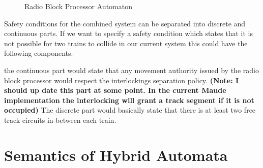 \begin{figure} [H]
\begin{center}
\end{center}

\label{fig:RBCAuton}
\caption{Radio Block Processor Automaton}
\end{figure}


Safety conditions for the combined system can be separated into discrete and continuous parts.  If we want to specify a safety condition which states that it is not possible for two trains to collide in our current system this could have the following components. 

the continuous part would state that any movement authority issued by the radio block processor would respect the interlockings separation policy. \textbf{(Note: I should up date this part at some point. In the current Maude implementation the interlocking will grant a track segment if it is not occupied)} The discrete part would basically state that there is at least two free track circuits in-between each train.

\section{Semantics of Hybrid Automata}

